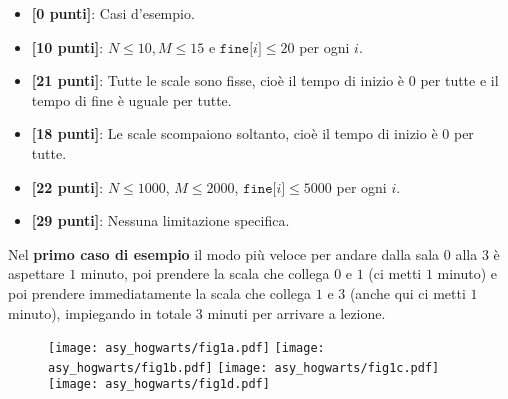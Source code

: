 \begin{itemize}[nolistsep,itemsep=2mm]
  \item \textbf{ [\phantom{1}0 punti]}: Casi d'esempio.
  \item \textbf{ [10 punti]}: $N \le 10, M \le 15$ e $\texttt{fine[}i\texttt{]} \le 20$ per ogni $i$.
  \item \textbf{ [21 punti]}: Tutte le scale sono fisse, cioè il tempo di inizio è $0$ per tutte e il tempo di fine è uguale per tutte.
  \item \textbf{ [18 punti]}: Le scale scompaiono soltanto, cioè il tempo di inizio è $0$ per tutte.
  \item \textbf{ [22 punti]}: $N \leq 1000$, $M \le 2000$, $\texttt{fine[}i\texttt{]} \le 5000$ per ogni $i$.
  \item \textbf{ [29 punti]}: Nessuna limitazione specifica.
\end{itemize}



\Examples

\begin{example}
%
%
\end{example}



\Explanation

Nel \textbf{primo caso di esempio} il modo più veloce per andare dalla sala $0$ alla $3$ è aspettare $1$ minuto, poi prendere la scala che collega $0$ e $1$ (ci metti $1$ minuto) e poi prendere immediatamente la scala che collega $1$ e $3$ (anche qui ci metti $1$ minuto), impiegando in totale $3$ minuti per arrivare a lezione.\\[2mm]

\begin{figure}[!h]
	\centering
	\texttt{[image: asy\_hogwarts/fig1a.pdf]}
	\texttt{[image: asy\_hogwarts/fig1b.pdf]}
	\texttt{[image: asy\_hogwarts/fig1c.pdf]}
	\texttt{[image: asy\_hogwarts/fig1d.pdf]}
\end{figure}

